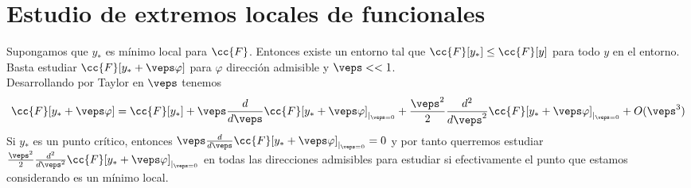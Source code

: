 \section{Estudio de extremos locales de funcionales}

Supongamos que $y_*$ es mínimo local para $\cc{F}$. Entonces existe un entorno tal que $\cc{F}[y_*] \leq \cc{F}[y]$ para todo $y$ en el entorno. Basta estudiar $\cc{F}[y_*+\veps\varphi]$ para $\varphi$ dirección admisible y $\veps << 1$. \\

Desarrollando por Taylor en $\veps$ tenemos 
\begin{gather*}
    \cc{F}[y_*+\veps\varphi] = \cc{F}[y_*] + \veps \frac{d}{d\veps} \cc{F}[y_*+\veps\varphi]_{|_{\veps=0}} + \frac{\veps^2}{2} \frac{d^2}{d\veps^2}\cc{F}[y_*+\veps\varphi]_{|_{\veps=0}} + O(\veps^3) 
\end{gather*}
Si $y_*$ es un punto crítico, entonces $\veps \frac{d}{d\veps} \cc{F}[y_*+\veps\varphi]_{|_{\veps=0}} = 0$ y por tanto querremos estudiar $\frac{\veps^2}{2} \frac{d^2}{d\veps^2}\cc{F}[y_*+\veps\varphi]_{|_{\veps=0}}$ en todas las direcciones admisibles para estudiar si efectivamente el punto que estamos considerando es un mínimo local.
